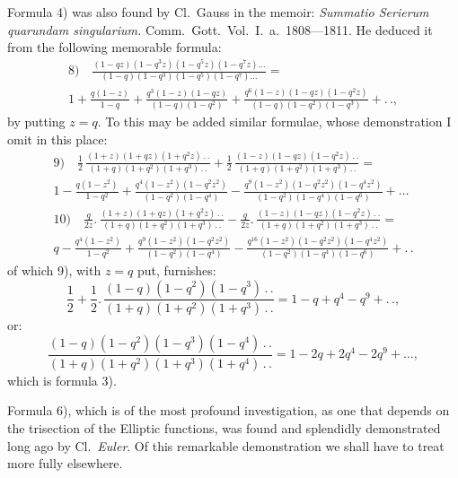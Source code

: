 \documentclass{article}
\begin{document}
Formula 4) was also found by Cl.\ Gauss in the memoir: \emph{Summatio Serierum quarundam singularium.} Comm.\ Gott.\ Vol.\ I.\ a.\ 1808---1811. He deduced it from the following memorable formula:
\[
\begin{gathered}
\text{8)}\quad\frac{(1-qz)(1-q^{3}z)(1-q^{5}z)(1-q^{7}z)\ldots}{(1-q)(1-q^{3})(1-q^{5})(1-q^{7})\ldots}=\\[1.5ex]
1+\frac{q(1-z)}{1-q}+\frac{q^{3}(1-z)(1-qz)}{(1-q)(1-q^{2})}+\frac{q^{6}(1-z)(1-qz)(1-q^{2}z)}{(1-q)(1-q^{2})(1-q^{3})}+.\,.,
\end{gathered}
\]
by putting $z=q$. To this may be added similar formulae, whose demonstration I omit in this place:
\[
\begin{gathered}
\text{9)}\quad\frac{1}{2}\,\frac{(1+z)(1+qz)(1+q^{2}z)\,.\,.}{(1+q)(1+q^{2})(1+q^{3})\,.\,.}+\frac{1}{2}\,\frac{(1-z)(1-qz)(1-q^{2}z)\,.\,.}{(1+q)(1+q^{2})(1+q^{3})\,.\,.}=\\[1.5ex]
1-\frac{q(1-z^{2})}{1-q^{2}}+\frac{q^{4}(1-z^{2})(1-q^{2}z^{2})}{(1-q^{2})(1-q^{4})}-\frac{q^{9}(1-z^{2})(1-q^{2}z^{2})(1-q^{4}z^{2})}{(1-q^{2})(1-q^{4})(1-q^{6})}+\ldots\\[2ex]
\text{10)}\quad\frac{q}{2z}.\,\frac{(1+z)(1+qz)(1+q^{2}z)\,.\,.}{(1+q)(1+q^{2})(1+q^{3})\,.\,.}-\frac{q}{2z}.\,\frac{(1-z)(1-qz)(1-q^{2}z)\,.\,.}{(1+q)(1+q^{2})(1+q^{3})\,.\,.}=\\[1.5ex]
q-\frac{q^{4}(1-z^{2})}{1-q^{2}}+\frac{q^{9}(1-z^{2})(1-q^{2}z^{2})}{(1-q^{2})(1-q^{4})}-\frac{q^{16}(1-z^{2})(1-q^{2}z^{2})(1-q^{4}z^{2})}{(1-q^{2})(1-q^{4})(1-q^{6})}+.\,.
\end{gathered}
\]
of which 9), with $z=q$ put, furnishes:
\[
\frac{1}{2}+\frac{1}{2}.\,\frac{(1-q)(1-q^{2})(1-q^{3})\,.\,.}{(1+q)(1+q^{2})(1+q^{3})\,.\,.}=1-q+q^{4}-q^{9}+.\,.,
\]
or:
\[
\frac{(1-q)(1-q^{2})(1-q^{3})(1-q^{4})\,.\,.}{(1+q)(1+q^{2})(1+q^{3})(1+q^{4})\,.\,.}=1-2q+2q^{4}-2q^{9}+\ldots,
\]
which is formula 3).

Formula 6), which is of the most profound investigation, as one that depends on the trisection of the Elliptic functions, was found and splendidly demonstrated long ago by Cl.\ \emph{Euler}. Of this remarkable demonstration we shall have to treat more fully elsewhere.

\end{document}
